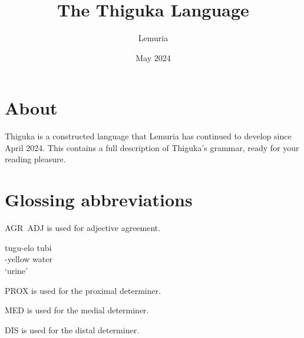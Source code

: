 \documentclass{thiguka}
\title{The Thiguka Language}
\date{May 2024}
\author{Lemuria}
\begin{document}
\maketitle

\newpage

\thigukacopyright{}

\section*{About}
Thiguka is a constructed language that Lemuria has continued to develop since April 2024.
This contains a full description of Thiguka's grammar, ready for your reading pleasure.

\section*{Glossing abbreviations}

AGR~ADJ is used for adjective agreement.
\begin{exe}
    \ex{} \gll{}tu\textapprox{}gu-elo tubi\\
    \agradj{}-yellow water\\
    \glt{}`urine'
\end{exe}

PROX is used for the proximal determiner.

MED is used for the medial determiner.

DIS is used for the distal determiner.

\newpage

\tableofcontents







\end{document}
